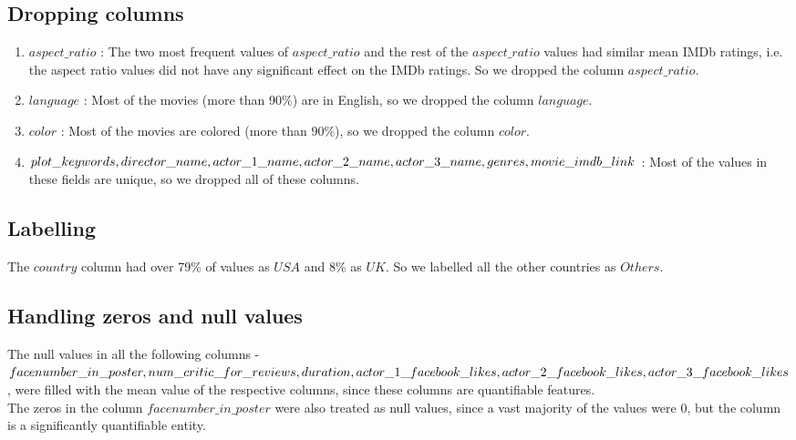 \documentclass[conference]{IEEEtran}
\begin{document}
\subsection{Dropping columns}
	\begin{enumerate}
		\item $aspect\_ratio$ : The two most frequent values of $aspect\_ratio			$ and the rest of the $aspect\_ratio$ values had similar mean IMDb 				ratings, i.e. the aspect ratio values did not have any significant effect on the IMDb ratings. So we dropped the column $aspect\_ratio$.\\
		
		\item $language$ : Most of the movies (more than 90$\%$) are in 				English, so we dropped the column $language$.\\
		
		\item $color$ : Most of the movies are colored (more than 90$\%$), so 			we dropped the column $color$.\\
		
		\item $plot\_keywords, director\_name, actor\_1\_name, \\ actor					\_2\_name,			actor\_3\_name, genres,\\ movie\_imdb\_link$ : 				Most 			of the values in 				these fields are 				unique, so we dropped 		all of these columns.\\
	\end{enumerate}
\subsection{Labelling}
The $country$ column had over 79$\%$ of values as $USA$ and 8$\%$ as $UK$. So we labelled all the other countries as $Others$.\\
\subsection{Handling zeros and null values}
The null values in all the following columns - $facenumber\_in\_poster, num\_critic\_for\_reviews, duration, \\ actor\_1\_facebook\_likes, actor\_2\_facebook\_likes, \\actor\_3\_facebook\_likes$, were filled with the mean value of the respective columns, since these columns are quantifiable features. \\
The zeros in the column $facenumber\_in\_poster$ were also treated as null values, since a vast majority of the values were 0, but the column is a significantly quantifiable entity. \\
\end{document}
